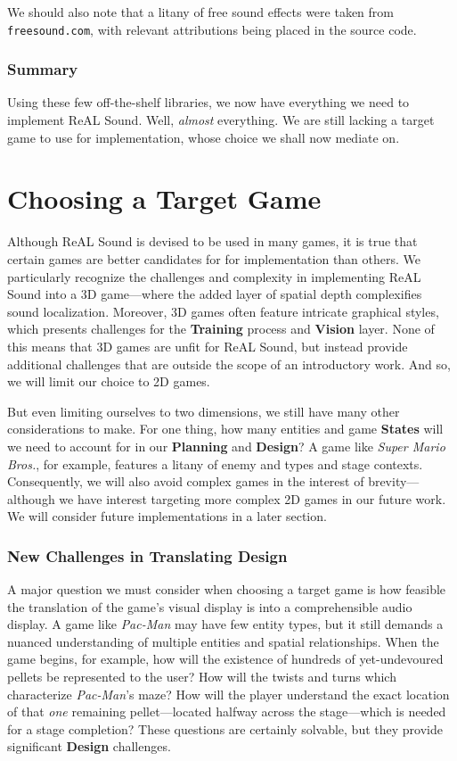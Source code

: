 \documentclass{report}
\newcommand{\rs}{ReAL Sound\xspace}
\newcommand{\plan}{\textbf{Planning}\xspace}
\newcommand{\train}{\textbf{Training}\xspace}
\newcommand{\design}{\textbf{Design}\xspace}
\newcommand{\state}[1]{\textbf{#1}}
\newcommand{\vision}{\textbf{Vision}\xspace}
\begin{document}
We should also note that a litany of free sound effects were taken from \texttt{freesound.com}, with relevant attributions being placed in the source code.

\subsubsection{Summary}
Using these few off-the-shelf libraries, we now have everything we need to implement \rs. Well, \emph{almost} everything. We are still lacking a target game to use for implementation, whose choice we shall now mediate on.

\section{Choosing a Target Game}

Although \rs is devised to be used in many games, it is true that certain games are better candidates for for implementation than others. We particularly recognize the challenges and complexity in implementing \rs into a 3D game---where the added layer of spatial depth complexifies sound localization. Moreover, 3D games often feature intricate graphical styles, which presents challenges for the \train process and \vision layer. None of this means that 3D games are unfit for \rs, but instead provide additional challenges that are outside the scope of an introductory work. And so, we will limit our choice to 2D games.

But even limiting ourselves to two dimensions, we still have many other considerations to make. For one thing, how many entities and game \state{States} will we need to account for in our \plan and \design? A game like \emph{Super Mario Bros.}, for example, features a litany of enemy and types and stage contexts. Consequently, we will also avoid complex games in the interest of brevity---although we have interest targeting more complex 2D games in our future work. We will consider future implementations in a later section.

\subsubsection{New Challenges in Translating Design}

A major question we must consider when choosing a target game is how feasible the translation of the game's visual display is into a comprehensible audio display. A game like \emph{Pac-Man} may have few entity types, but it still demands a nuanced understanding of multiple entities and spatial relationships. When the game begins, for example, how will the existence of hundreds of yet-undevoured pellets be represented to the user? How will the twists and turns which characterize \emph{Pac-Man}'s maze? How will the player understand the exact location of that \emph{one} remaining pellet---located halfway across the stage---which is needed for a stage completion? These questions are certainly solvable, but they provide significant \design challenges. 
\end{document}
